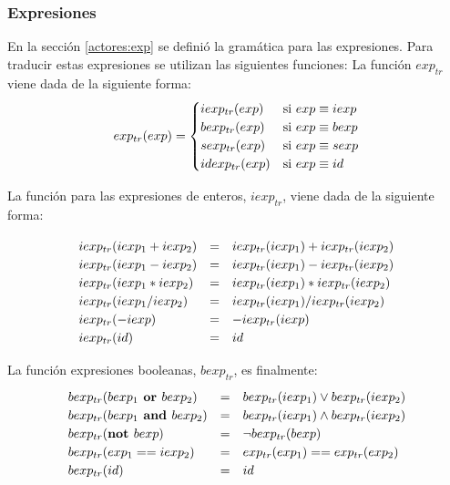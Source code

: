 \subsubsection*{Expresiones}
En la sección \ref{actores:exp} se definió la gramática para las expresiones. Para traducir estas expresiones se utilizan las siguientes funciones:
La función $exp_{tr}$ viene dada de la siguiente forma:
\begin{equation*}
  exp_{tr}(exp) =
  \setlength{\arraycolsep}{0pt}
  \renewcommand{\arraystretch}{1.2}
  \left\{\begin{array}{l @{\quad} l}
        iexp_{tr}(exp)    & \text{si $exp \equiv iexp$} \\
        bexp_{tr}(exp)    & \text{si $exp \equiv bexp$} \\
        sexp_{tr}(exp)    & \text{si $exp \equiv sexp$} \\
        idexp_{tr}(exp)   & \text{si $exp \equiv id$} \\
  \end{array}\right.
\end{equation*}

La función para las expresiones de enteros, $iexp_{tr}$, viene dada de la siguiente forma:

\begin{equation*}
\begin{array}{l c l}
iexp_{tr}(iexp_1 + iexp_2) &=& iexp_{tr}(iexp_1) + iexp_{tr}(iexp_2) \\
iexp_{tr}(iexp_1 - iexp_2) &=& iexp_{tr}(iexp_1) - iexp_{tr}(iexp_2) \\
iexp_{tr}(iexp_1 * iexp_2) &=& iexp_{tr}(iexp_1) * iexp_{tr}(iexp_2) \\ 
iexp_{tr}(iexp_1 / iexp_2) &=& iexp_{tr}(iexp_1) / iexp_{tr}(iexp_2) \\
iexp_{tr}(- iexp) &=& - iexp_{tr}(iexp) \\
iexp_{tr}(id) &=& id
\end{array}
\end{equation*}

La función expresiones booleanas, $bexp_{tr}$, es finalmente:
\begin{equation*}
\begin{array}{l c l}
bexp_{tr}(bexp_1 \textbf{ or } bexp_2) &=& bexp_{tr}(iexp_1) \vee bexp_{tr}(iexp_2) \\
bexp_{tr}(bexp_1 \textbf{ and } bexp_2) &=& bexp_{tr}(iexp_1) \wedge bexp_{tr}(iexp_2) \\
bexp_{tr}(\textbf{not } bexp) &=& \neg bexp_{tr}(bexp) \\ 
bexp_{tr}(exp_1 == iexp_2) &=& exp_{tr}(exp_1) == exp_{tr}(exp_2) \\
bexp_{tr}(id) &=& id
\end{array}
\end{equation*}

